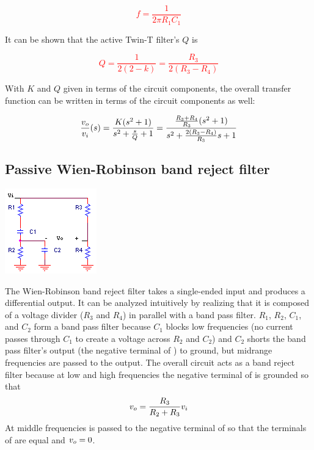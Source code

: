 \textcolor{red}{
\begin{equation}
f = \frac{1}{2\pi R_{1}C_{1}}
\end{equation}
}

It can be shown \autocite[322]{op-amps-for-everyone} that the active Twin-T filter's $Q$ is

\textcolor{red}{
\begin{equation}
Q = \frac{1}{2(2-k)} = \frac{R_{3}}{2(R_{3}-R_{4})}
\end{equation}
}

With $K$ and $Q$ given in terms of the circuit components, the overall transfer function can be written in terms of the circuit components as well:

\textcolor{red}{
\begin{equation}
\frac{\vout}{\vin}(s) = \frac{K(s^2 + 1)}{s^2 + \frac{s}{Q} + 1} = \frac{\frac{R_3 + R_4}{R_3}(s^2 + 1)}{s^2 + \frac{2(R_3 - R_4)}{R_3}s+1}
\end{equation}
}

\subsection{Passive Wien-Robinson band reject filter}
\begin{center}
	\includegraphics{schematics/passiveWien-Robinsonbandrejectfilter.PNG}
\end{center}
The Wien-Robinson band reject filter takes a single-ended input and produces a differential output.
It can be analyzed intuitively by realizing that it is composed of a voltage divider ($R_3$ and $R_4$) in parallel with a band pass filter.
$R_1$, $R_2$, $C_1$, and $C_2$ form a band pass filter because $C_1$ blocks low frequencies (no current passes through $C_1$ to create a voltage across $R_2$ and $C_2$) and $C_2$ shorts the band pass filter's output (the negative terminal of \vout) to ground, but midrange frequencies are passed to the output.
The overall circuit acts as a band reject filter because at low and high frequencies the negative terminal of \vout is grounded so that \[\vout = \frac{R_{3}}{R_{2}+R_{3}}v_{i}\]
At middle frequencies \vin is passed to the negative terminal of \vout so that the terminals of \vout are equal and $\vout = 0$.

